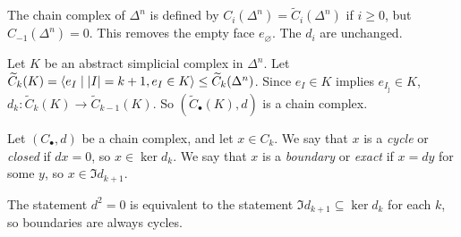 \begin{example}
	The chain complex of \( \Delta^n \) is defined by \( C_i(\Delta^n) = \widetilde C_i(\Delta^n) \) if \( i \geq 0 \), but \( C_{-1}(\Delta^n) = 0 \).
	This removes the empty face \( e_\varnothing \).
	The \( d_i \) are unchanged.
	\begin{center}
	\end{center}
\end{example}
\begin{definition}
	Let \( K \) be an abstract simplicial complex in \( \Delta^n \).
	Let \( \widetilde C_k(K) = \left\langle{} e_I \mid \abs{I} = k + 1, e_I \in K \right\rangle \leq \widetilde C_k(\Delta^n) \).
	Since \( e_I \in K \) implies \( e_{I_{\hat\jmath}} \in K \), \( d_k \colon \widetilde C_k(K) \to \widetilde C_{k-1}(K) \).
	So \( (\widetilde C_\bullet(K), d) \) is a chain complex.
\end{definition}
\begin{definition}
	Let \( (C_\bullet, d) \) be a chain complex, and let \( x \in C_k \).
	We say that \( x \) is a \emph{cycle} or \emph{closed} if \( d x = 0 \), so \( x \in \ker d_k \).
	We say that \( x \) is a \emph{boundary} or \emph{exact} if \( x = d y \) for some \( y \), so \( x \in \Im d_{k+1} \).
\end{definition}
\begin{remark}
	The statement \( d^2 = 0 \) is equivalent to the statement \( \Im d_{k+1} \subseteq \ker d_k \) for each \( k \), so boundaries are always cycles.
\end{remark}

